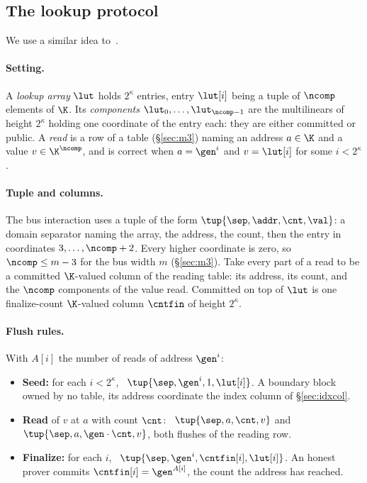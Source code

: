 \subsection{The lookup protocol}\label{sec:lookup}

We use a similar idea to~\cite[Protocol.~4.27]{DP23}.

\paragraph{Setting.} A \emph{lookup array} $\lut$ holds $2^{\kappa}$ entries, entry $\lut[i]$ being a tuple of $\ncomp$ elements of $\K$. Its \emph{components} $\lut_0,\dots,\lut_{\ncomp-1}$ are the multilinears of height $2^{\kappa}$ holding one coordinate of the entry each: they are either committed or public. A \emph{read} is a row of a table (\S\ref{sec:m3}) naming an address $a\in\K$ and a value $v\in\K^{\ncomp}$, and is correct when $a=\gen^{i}$ and $v=\lut[i]$ for some $i<2^{\kappa}$.

\paragraph{Tuple and columns.} The bus interaction uses a tuple of the form $\tup{\sep,\addr,\cnt,\val}$: a domain separator naming the array, the address, the count, then the entry in coordinates $3,\dots,\ncomp+2$. Every higher coordinate is zero, so $\ncomp\le m-3$ for the bus width $m$ (\S\ref{sec:m3}). Take every part of a read to be a committed $\K$-valued column of the reading table: its address, its count, and the $\ncomp$ components of the value read. Committed on top of $\lut$ is one finalize-count $\K$-valued column $\cntfin$ of height $2^{\kappa}$.

\paragraph{Flush rules.} With $A[i]$ the number of reads of address $\gen^{i}$:
\begin{itemize}
\item \textbf{Seed:} for each $i<2^{\kappa}$, \push\ $\tup{\sep,\gen^{i},1,\lut[i]}$. A boundary block owned by no table, its address coordinate the index column of \S\ref{sec:idxcol}.
\item \textbf{Read} of $v$ at $a$ with count $\cnt$: \pull\ $\tup{\sep,a,\cnt,v}$ and \push\ $\tup{\sep,a,\gen\cdot\cnt,v}$, both flushes of the reading row.
\item \textbf{Finalize:} for each $i$, \pull\ $\tup{\sep,\gen^{i},\cntfin[i],\lut[i]}$. An honest prover commits $\cntfin[i]=\gen^{A[i]}$, the count the address has reached.
\end{itemize}

